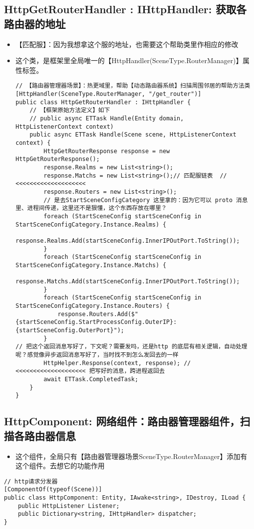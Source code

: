 \documentclass[9pt, b5paper]{article}
\begin{document}
\subsection{HttpGetRouterHandler : IHttpHandler: 获取各路由器的地址}
\label{sec-7-12}
\begin{itemize}
\item 【匹配服】：因为我想拿这个服的地址，也需要这个帮助类里作相应的修改
\item 这个类，是框架里全局唯一的【HttpHandler(SceneType.RouterManager)】属性标签。
\begin{verbatim}
// 【路由器管理器场景】：热更域里，帮助【动态路由器系统】扫描周围邻居的帮助方法类
[HttpHandler(SceneType.RouterManager, "/get_router")]
public class HttpGetRouterHandler : IHttpHandler {
    // 【框架原始方法定义】如下
    // public async ETTask Handle(Entity domain, HttpListenerContext context)
    public async ETTask Handle(Scene scene, HttpListenerContext context) {
        HttpGetRouterResponse response = new HttpGetRouterResponse();
        response.Realms = new List<string>();
        response.Matchs = new List<string>();// 匹配服链表  // <<<<<<<<<<<<<<<<<<<< 
        response.Routers = new List<string>();
        // 是去StartSceneConfigCategory 这里拿的：因为它可以 proto 消息里、进程间传递，这里还不是狠懂，这个东西存放在哪里？
        foreach (StartSceneConfig startSceneConfig in StartSceneConfigCategory.Instance.Realms) {
            response.Realms.Add(startSceneConfig.InnerIPOutPort.ToString());
        }
        foreach (StartSceneConfig startSceneConfig in StartSceneConfigCategory.Instance.Matchs) {
            response.Matchs.Add(startSceneConfig.InnerIPOutPort.ToString());
        }
        foreach (StartSceneConfig startSceneConfig in StartSceneConfigCategory.Instance.Routers) {
            response.Routers.Add($"{startSceneConfig.StartProcessConfig.OuterIP}:{startSceneConfig.OuterPort}");
        }
// 把这个返回消息写好了，下文呢？需要发吗，还是http 的底层有相关逻辑，自动处理呢？感觉像异步返回消息写好了，当时找不到怎么发回去的一样
        HttpHelper.Response(context, response); // <<<<<<<<<<<<<<<<<<<< 把写好的消息，跨进程返回去
        await ETTask.CompletedTask;
    }
}
\end{verbatim}
\end{itemize}
\subsection{HttpComponent: 网络组件：路由器管理器组件，扫描各路由器信息}
\label{sec-7-13}
\begin{itemize}
\item 这个组件，全局只有【路由器管理器场景SceneType.RouterManager】添加有这个组件。去想它的功能作用
\end{itemize}
\begin{verbatim}
// http请求分发器
[ComponentOf(typeof(Scene))]
public class HttpComponent: Entity, IAwake<string>, IDestroy, ILoad {
    public HttpListener Listener;
    public Dictionary<string, IHttpHandler> dispatcher;
}
\end{verbatim}
\end{document}
